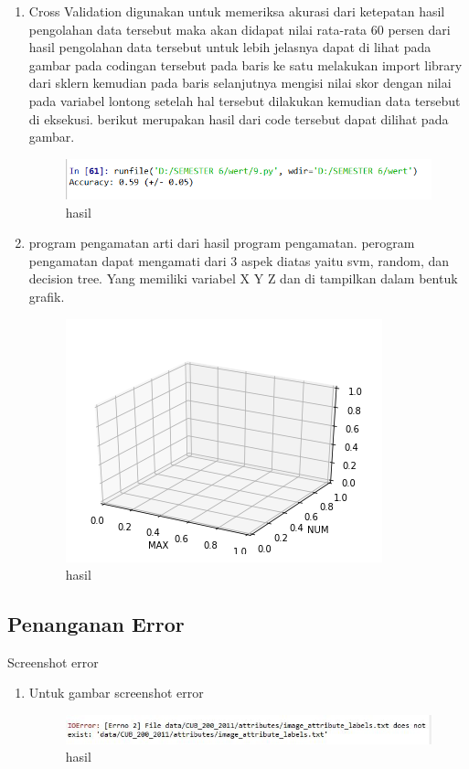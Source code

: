 \begin{enumerate}
\item Cross Validation
 digunakan untuk memeriksa akurasi dari ketepatan hasil pengolahan data tersebut maka akan didapat nilai rata-rata 60 persen dari hasil pengolahan data tersebut untuk lebih jelasnya dapat di lihat pada gambar pada codingan tersebut pada baris ke satu melakukan import library dari sklern kemudian pada baris selanjutnya mengisi nilai skor dengan nilai pada variabel lontong setelah hal tersebut dilakukan kemudian data tersebut di eksekusi. berikut merupakan hasil dari code tersebut dapat dilihat pada gambar.

\begin{figure}[ht]
\centering
\includegraphics[scale=0.5]{figures/1174003/3/10.PNG}
\caption{hasil}
\label{contoh}
\end{figure}

\item program pengamatan
arti dari hasil program pengamatan. perogram pengamatan dapat mengamati dari 3 aspek diatas yaitu svm, random, dan decision tree. Yang memiliki variabel X Y Z dan di tampilkan dalam bentuk grafik. 

\begin{figure}[ht]
\centering
\includegraphics[scale=0.5]{figures/1174003/3/11.PNG}
\caption{hasil}
\label{contoh}
\end{figure}
\end{enumerate}


\subsection{Penanganan Error}
Screenshot error
\begin{enumerate}
\item  Untuk gambar screenshot error
\begin{figure}[ht]
\centering
\includegraphics[scale=0.5]{figures/1174003/3/error.PNG}
\caption{hasil}
\label{contoh}
\end{figure}
\end{enumerate}

